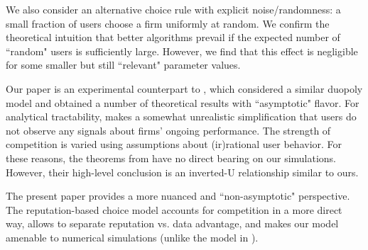 \documentclass[acmsmall]{ec19acm}
\theoremstyle{definition}
\newcommand{\xhdr}[1]{\vspace{1mm} \noindent{\bf #1}}
\begin{document}
We also consider an alternative choice rule with explicit noise/randomness: a small fraction of users choose a firm uniformly at random. We confirm the theoretical intuition that better algorithms prevail if the expected number of ``random" users is sufficiently large. However, we find that this effect is negligible for some smaller but still ``relevant" parameter values.


\xhdr{Discussion.}
Our paper is an experimental counterpart to \cite{CompetingBandits-itcs18}, which considered a similar duopoly model and obtained a number of theoretical results with ``asymptotic" flavor. For analytical tractability, \cite{CompetingBandits-itcs18} makes a somewhat unrealistic simplification that users do not observe any signals about firms' ongoing performance. The strength of competition is varied using assumptions about (ir)rational user behavior. For these reasons, the theorems from \cite{CompetingBandits-itcs18} have no direct bearing on our simulations. However, their high-level conclusion  is an inverted-U relationship similar to ours.

The present paper provides a more nuanced and ``non-asymptotic" perspective. The reputation-based choice model accounts for competition in a more direct way, allows to separate reputation vs. data advantage, and makes our model amenable to numerical simulations (unlike the model in \cite{CompetingBandits-itcs18}).



\end{document}
